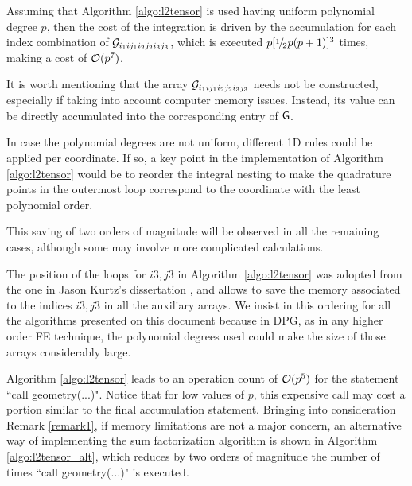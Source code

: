 Assuming that Algorithm \ref{algo:l2tensor} is used having uniform polynomial degree $p$, then the cost of the integration is driven by the accumulation for each index combination of $\mathcal{G}_{i_1ij_1i_2j_2i_3j_3}$, which is executed $p[\onehalf p(p+1)]^3$ times, making a cost of $\mathcal{O}(p^7)$.

It is worth mentioning that the array $\mathcal{G}_{i_1ij_1i_2j_2i_3j_3}$ needs not be constructed, especially if taking into account computer memory issues. Instead, its value can be directly accumulated into the corresponding entry of $\mathsf{G}$.

In case the polynomial degrees are not uniform, different 1D rules could be applied per coordinate. If so, a key point in the implementation of Algorithm \ref{algo:l2tensor} would be to reorder the integral nesting to make the quadrature points in the outermost loop correspond to the coordinate with the least polynomial order.

This saving of two orders of magnitude will be observed in all the remaining cases, although some may involve more complicated calculations.

\begin{remark}
    The position of the loops for $i3,j3$ in Algorithm \ref{algo:l2tensor} was adopted from the one in Jason Kurtz's dissertation \cite{kurtz2007fully}, and allows to save the memory associated to the indices $i3,j3$ in all the auxiliary arrays. We insist in this ordering for all the algorithms presented on this document because in DPG, as in any higher order FE technique, the polynomial degrees used could make the size of those arrays considerably large.
\label{remark1}
\end{remark}

\begin{remark}
    Algorithm \ref{algo:l2tensor} leads to an operation count of $\mathcal{O}(p^5)$ for the statement ``call geometry(...)". Notice that for low values of $p$, this expensive call may cost a portion similar to the final accumulation statement. Bringing into consideration Remark \ref{remark1}, if memory limitations are not a major concern, an alternative way of implementing the sum factorization algorithm is shown in Algorithm \ref{algo:l2tensor_alt}, which reduces by two orders of magnitude the number of times ``call geometry(...)" is executed.
    \label{remark2}
\end{remark}

